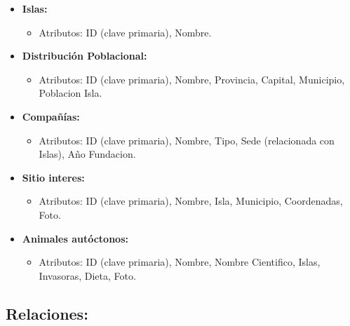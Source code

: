 \documentclass[11pt]{report}
\begin{document}
\begin{itemize}
    \item \textbf{Islas:}
    \begin{itemize}
        \item Atributos: ID (clave primaria), Nombre.
    \end{itemize}
    
    \item \textbf{Distribución Poblacional:}
    \begin{itemize}
        \item Atributos: ID (clave primaria), Nombre, Provincia, Capital, Municipio, Poblacion Isla.
    \end{itemize}
    
    \item \textbf{Compañías:}
    \begin{itemize}
        \item Atributos: ID (clave primaria), Nombre, Tipo, Sede (relacionada con Islas), Año Fundacion.
    \end{itemize}
    
    \item \textbf{Sitio interes:}
    \begin{itemize}
        \item Atributos: ID (clave primaria), Nombre, Isla, Municipio, Coordenadas, Foto.
    \end{itemize}
    
    \item \textbf{Animales autóctonos:}
    \begin{itemize}
        \item Atributos: ID (clave primaria), Nombre, Nombre Cientifico, Islas, Invasoras, Dieta, Foto.
    \end{itemize}
\end{itemize}

\subsection{Relaciones:}
\end{document}

